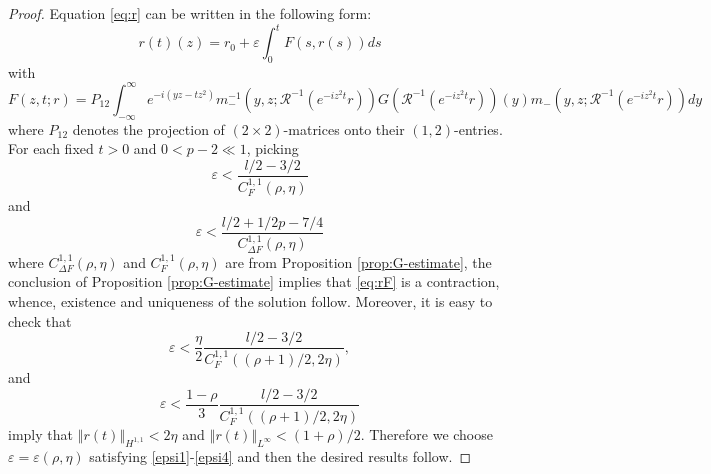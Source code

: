\documentclass[10pt,a4paper]{amsart}
\newcommand{\norm}[2]{\left\Vert #1\right\Vert_{#2}}
\begin{document}
\begin{proof}
    Equation \eqref{eq:r} can be written in the following form:
\begin{equation}
    \label{eq:rF}
    r(t)(z)=r_0+\varepsilon \int_0^t F(s, r(s)) d s
\end{equation}
with
\begin{equation}
\label{F}
    F(z,t;r)=P_{12} \int_{-\infty}^{\infty} e^{-i\left(y z-t z^2\right)} m_{-}^{-1}\left(y, z ; \mathcal{R}^{-1}\left(e^{-i z^2 t} r\right)\right) G\left(\mathcal{R}^{-1}\left(e^{-i z^2 t} r\right)\right)(y) m_{-}\left(y, z ; \mathcal{R}^{-1}\left(e^{-i z^2 t} r\right)\right) d y
\end{equation}
where $P_{12}$ denotes the projection of $(2\times2)$-matrices onto their $(1, 2)$-entries. For each fixed $t>0$ and $0<p-2\ll 1$, picking
\begin{equation}
\label{epsi1}
    \varepsilon <\frac{l/2-3/2}{ C_{F}^{1,1}(\rho, \eta)}
\end{equation}
and 
\begin{equation}
\label{epsi2}
    \varepsilon <\frac{l/2+1/2p-7/4}{C_{\Delta F}^{1,1}(\rho, \eta) }
\end{equation}where $C_{\Delta F}^{1,1}(\rho, \eta)$ and $ C_{F}^{1,1}(\rho, \eta)$ are from Proposition \ref{prop:G-estimate}, the conclusion of Proposition \ref{prop:G-estimate}
implies that \eqref{eq:rF} is a contraction, whence,  existence and uniqueness of the solution follow. Moreover, it is easy to check that
\begin{equation}
\label{epsi3}
    \varepsilon <\frac{\eta}{2}\frac{l/2-3/2}{C_{F}^{1,1}((\rho+1)/2, 2\eta)} ,
\end{equation}
and 
\begin{equation}
\label{epsi4}
     \varepsilon <\frac{1-\rho}{3}\frac{l/2-3/2}{ C_{F}^{1,1}((\rho+1)/2, 2\eta)}
\end{equation}
imply that $\norm{r(t)}{H^{1,1}}<2\eta$ and $\norm{r(t)}{L^\infty}<(1+\rho)/2$. Therefore we choose $\varepsilon=\varepsilon(\rho, \eta) $ satisfying \eqref{epsi1}-\eqref{epsi4} and then the desired results follow.
\end{proof}
\end{document}

